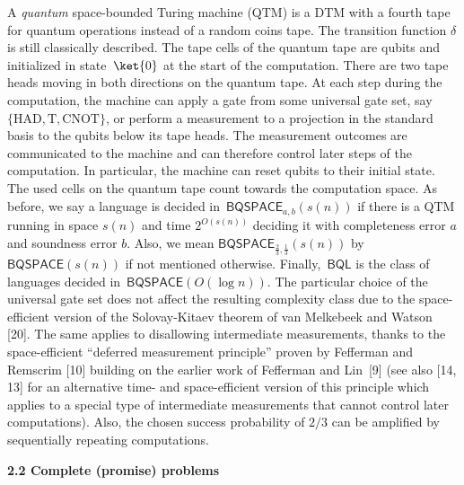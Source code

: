 A \emph{quantum} space-bounded Turing machine (QTM) is a DTM with a fourth tape for quantum operations instead of a random coins tape.
The transition function $\delta$ is still classically described. The tape cells of the quantum tape are qubits and initialized in state $\ket{0}$ at the start of the computation. There are two tape heads moving in both directions on the quantum tape. At each step during the computation, the machine can apply a gate from some universal gate set, say $\{\mathrm{HAD},\mathrm{T},\mathrm{CNOT}\}$, or perform a measurement to a projection in the standard basis to the qubits below its tape heads.
The measurement outcomes are communicated to the machine and can therefore control later steps of the computation. In particular, the machine can reset qubits to their initial state.
The used cells on the quantum tape count towards the computation space.
As before, we say a language is decided in $\mathsf{BQSPACE}_{a,b}(s(n))$ if there is a QTM running in space $s(n)$ and time $2^{O(s(n))}$ deciding it with completeness error $a$ and soundness error $b$. Also, we mean $\mathsf{BQSPACE}_{\frac{2}{3},\frac{1}{3}}(s(n))$ by $\mathsf{BQSPACE}(s(n))$ if not mentioned otherwise.
Finally, $\mathsf{BQL}$ is the class of languages decided in $\mathsf{BQSPACE}(O(\log n))$.
The particular choice of the universal gate set does not affect the resulting complexity class due to the space-efficient version of the Solovay-Kitaev theorem of van Melkebeek and Watson [20].
The same applies to disallowing intermediate measurements, thanks to the space-efficient “deferred measurement principle” proven by Fefferman and Remscrim [10] building on the earlier work of Fefferman and Lin [9] (see also [14, 13] for an alternative time- and space-efficient version of this principle which applies to a special type of intermediate measurements that cannot control later computations).
Also, the chosen success probability of $2/3$ can be amplified by sequentially repeating computations.\par





\par\medskip\noindent\textbf{
2.2 Complete (promise) problems}\par




